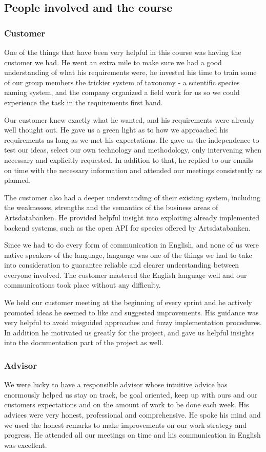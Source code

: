 \subsection{People involved and the course}
	\subsubsection{Customer}
One of the things that have been very helpful in this course was having the
customer we had. He went an extra mile to make sure we had a good understanding
of what his requirements were, he invested his time to train some of our
group members the trickier system of taxonomy - a scientific species naming
system, and the company organized a field work for us so we could experience the
task in the requirements first hand.

Our customer knew exactly what he wanted, and his requirements were already well
thought out. He gave us a green light as to how we approached his requirements
as long as we met his expectations. He gave us the independence to test our
ideas, select our own technology and methodology, only intervening when
necessary and explicitly requested. In addition to that, he replied to our
emails on time with the necessary information and attended our meetings
consistently as planned.

The customer also had a deeper understanding of their existing system, including
the weaknesses, strengths and the semantics of the business areas of
Artsdatabanken. He provided helpful insight into exploiting already implemented
backend systems, such as the open API for species offered by Artsdatabanken.

Since we had to do every form of communication in English, and none of us were
native speakers of the language, language was one of the things we had to take
into consideration to guarantee reliable and clearer understanding between
everyone involved. The customer mastered the English language well and our
communications took place without any difficulty.

We held our customer meeting at the beginning of every sprint and he
actively promoted ideas he seemed to like and suggested improvements.  His
guidance was very helpful to avoid misguided approaches and fuzzy implementation
procedures. In addition he motivated us greatly for the project, and gave us
helpful insights into the documentation part of the project as well.

	\subsubsection{Advisor}
We were lucky to have a responsible advisor whose intuitive advice has
enormously helped us stay on track, be goal oriented, keep up with ours and our
customers expectations and on the amount of work to be done each week. His
advices were very honest, professional and comprehensive. He spoke his mind and
we used the honest remarks to make improvements on our work strategy and
progress. He attended all our meetings on time and his communication in English
was excellent.

